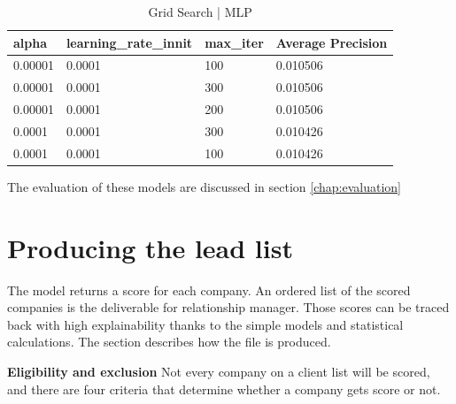 \documentclass[ %
                    author={Natchalin Iwsakul \\ Inkaphol Siriwongwattana \\ Tanaphan Kummaraphat \\ Patorn Srisupap},
                supervisor={Fernando Moreno-Pino},
                    degree={MSc},
                     title={Propensity Modelling for SME Commercial Lending Using Open Public Data},
                  subtitle={Companies House filings and GDELT media coverage as predictors of first-time borrowing},
                      type={},
                      year={2026}]{dissertation}
\begin{document}
  \begin{table}[h]
      \centering
      \begin{tabular}{llll}
      \toprule
          alpha & learning\_rate\_innit & max\_iter & Average Precision \\
      \midrule
          0.00001 & 0.0001 & 100 & 0.010506 \\
          0.00001 & 0.0001 & 300 & 0.010506 \\
          0.00001 & 0.0001 & 200 & 0.010506 \\
          0.0001 & 0.0001 & 300 & 0.010426 \\
          0.0001 & 0.0001 & 100 & 0.010426 \\
      \bottomrule
      \end{tabular}
      \caption{Grid Search | MLP}
      \label{gridsearchmlp}
  \end{table}

  The evaluation of these models are discussed in section \ref{chap:evaluation}







  

\section{Producing the lead list}              \label{sec:leadlist}
The model returns a score for each company. An ordered list of the scored companies is the deliverable for relationship manager. Those scores can be traced back with high explainability thanks to the simple models and statistical calculations. The section describes how the file is produced.

\textbf{Eligibility and exclusion}
Not every company on a client list will be scored, and there are four criteria that determine whether a company gets score or not.
\end{document}
